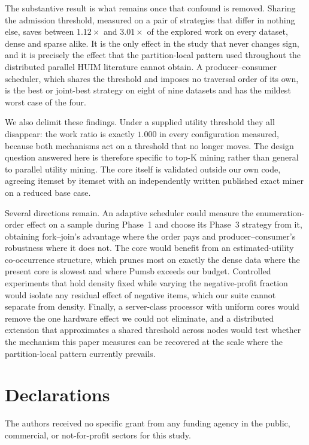 \documentclass[pdflatex,sn-vancouver-num]{sn-jnl}
\theoremstyle{thmstyleone}%
\theoremstyle{thmstyletwo}%
\theoremstyle{thmstylethree}%
\newcommand{\Kk}{\mathrm{K}}
\begin{document}
The substantive result is what remains once that confound is removed.
Sharing the admission threshold, measured on a pair of strategies that
differ in nothing else, saves between $1.12\times$ and $3.01\times$ of
the explored work on every dataset, dense and sparse alike. It is the
only effect in the study that never changes sign, and it is precisely the
effect that the partition-local pattern used throughout the distributed
parallel HUIM literature cannot obtain. A producer--consumer scheduler,
which shares the threshold and imposes no traversal order of its own, is
the best or joint-best strategy on eight of nine datasets and has the
mildest worst case of the four.
 
We also delimit these findings. Under a supplied utility threshold they
all disappear: the work ratio is exactly $1.000$ in every configuration
measured, because both mechanisms act on a threshold that no longer
moves. The design question answered here is therefore specific to
top-$\Kk$ mining rather than general to parallel utility mining. The core
itself is validated outside our own code, agreeing itemset by itemset
with an independently written published exact miner on a reduced base
case.
 
Several directions remain. An adaptive scheduler could measure the
enumeration-order effect on a sample during Phase~1 and choose its Phase~3
strategy from it, obtaining fork--join's advantage where the order pays
and producer--consumer's robustness where it does not. The core would
benefit from an estimated-utility co-occurrence structure, which prunes
most on exactly the dense data where the present core is slowest and
where Pumsb exceeds our budget. Controlled experiments that hold density
fixed while varying the negative-profit fraction would isolate any
residual effect of negative items, which our suite cannot separate from
density. Finally, a server-class processor with uniform cores would
remove the one hardware effect we could not eliminate, and a distributed
extension that approximates a shared threshold across nodes would test
whether the mechanism this paper measures can be recovered at the scale
where the partition-local pattern currently prevails.

\FloatBarrier
\section*{Declarations}

The authors received no specific grant from any funding agency in the public,
commercial, or not-for-profit sectors for this study.
\end{document}

